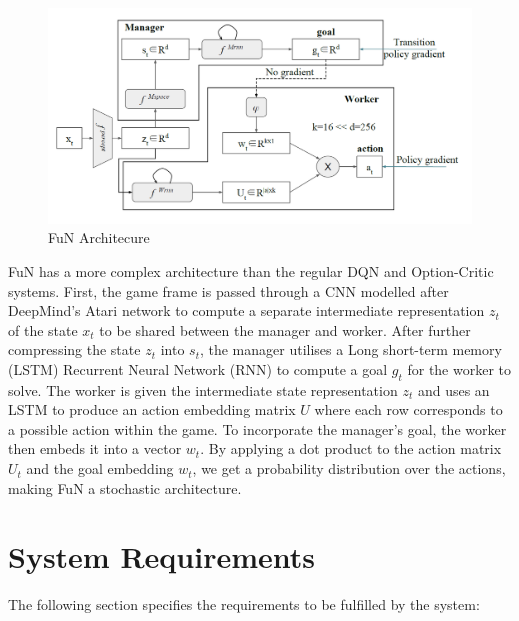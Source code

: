 \documentclass[notitlepage,a4paper,11pt]{article}
\begin{document}
\begin{figure}
	\begin{center}
		\includegraphics[width=.5\textwidth]{figs/fun_architecture.png}
	\end{center}
	\caption{FuN Architecure \protect\cite{vezhnevets2017feudal}} \label{fig:4}
\end{figure}


FuN has a more complex architecture than the regular DQN and Option-Critic systems. First, the game frame is passed through a CNN modelled after DeepMind's Atari \cite{DBLP:journals/corr/MnihKSGAWR13} network to compute a separate intermediate representation $z_t$ of the state $x_t$ to be shared between the manager and worker. After further compressing the state $z_t$ into $s_t$, the manager utilises a Long short-term memory (LSTM) Recurrent Neural Network (RNN) to compute a goal $g_t$ for the worker to solve. The worker is given the intermediate state representation $z_t$ and uses an LSTM to produce an action embedding matrix $U$ where each row corresponds to a possible action within the game. To incorporate the manager's goal, the worker then embeds it into a vector $w_t$. By applying a dot product to the action matrix $U_t$ and the goal embedding $w_t$, we get a probability distribution over the actions, making FuN a stochastic architecture. 

\section{System Requirements}

The following section specifies the requirements to be fulfilled by the system:
\end{document}
